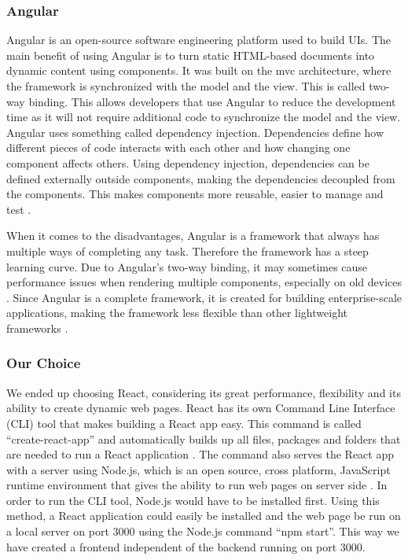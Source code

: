\subsubsection{Angular}
Angular is an open-source software engineering platform used to build UIs. The main benefit of using Angular is to turn static HTML-based documents into dynamic content using components. It was built on the \acrlong{mvc} architecture, where the framework is synchronized with the model and the view. This is called two-way binding. This allows developers that use Angular to reduce the development time as it will not require additional code to synchronize the model and the view. Angular uses something called dependency injection. Dependencies define how different pieces of code interacts with each other and how changing one component affects others. Using dependency injection, dependencies can be defined externally outside components, making the dependencies decoupled from the components. This makes components more reusable, easier to manage and test \cite{goodBadAngular}.

When it comes to the disadvantages, Angular is a framework that always has multiple ways of completing any task. Therefore the framework has a steep learning curve. Due to Angular's two-way binding, it may sometimes cause performance issues when rendering multiple components, especially on old devices \cite{AngularCons}. Since Angular is a complete framework, it is created for building enterprise-scale applications, making the framework less flexible than other lightweight frameworks \cite{goodBadAngular}.

\subsubsection{Our Choice}
We ended up choosing React, considering its great performance, flexibility and its ability to create dynamic web pages. React has its own Command Line Interface (CLI) tool that makes building a React app easy. This command is called ``create-react-app'' and automatically builds up all files, packages and folders that are needed to run a React application \cite{ReactGetStarted}. The command also serves the React app with a server using Node.js, which is an open source, cross platform, JavaScript runtime environment that gives the ability to run web pages on server side \cite{NodeJs}. In order to run the CLI tool, Node.js would have to be installed first. Using this method, a React application could easily be installed and the web page be run on a local server on port 3000 using the Node.js command ``npm start''. This way we have created a frontend independent of the backend running on port 3000.  

